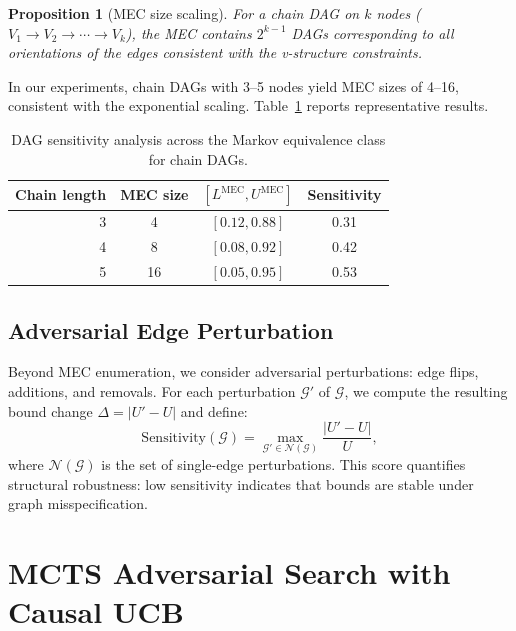 \documentclass[11pt,a4paper]{article}
\newtheorem{proposition}[theorem]{Proposition}
\newcommand{\calG}{\mathcal{G}}
\begin{document}
\begin{proposition}[MEC size scaling]
\label{prop:mec-size}
For a chain DAG on $k$ nodes ($V_1 \to V_2 \to \cdots \to V_k$), the MEC contains $2^{k-1}$ DAGs corresponding to all orientations of the edges consistent with the v-structure constraints.
\end{proposition}

In our experiments, chain DAGs with 3--5 nodes yield MEC sizes of 4--16, consistent with the exponential scaling. Table~\ref{tab:mec-results} reports representative results.

\begin{table}[t]
\centering
\caption{DAG sensitivity analysis across the Markov equivalence class for chain DAGs.}
\label{tab:mec-results}
\begin{tabular}{@{}rccc@{}}
\toprule
\textbf{Chain length} & \textbf{MEC size} & $[L^{\mathrm{MEC}}, U^{\mathrm{MEC}}]$ & \textbf{Sensitivity} \\
\midrule
3 & 4  & $[0.12, 0.88]$ & 0.31 \\
4 & 8  & $[0.08, 0.92]$ & 0.42 \\
5 & 16 & $[0.05, 0.95]$ & 0.53 \\
\bottomrule
\end{tabular}
\end{table}

\subsection{Adversarial Edge Perturbation}
\label{sec:edge-perturb}

Beyond MEC enumeration, we consider adversarial perturbations: edge flips, additions, and removals. For each perturbation $\calG'$ of $\calG$, we compute the resulting bound change $\Delta = |U' - U|$ and define:
\begin{equation}
\text{Sensitivity}(\calG) = \max_{\calG' \in \mathcal{N}(\calG)} \frac{|U' - U|}{U},
\end{equation}
where $\mathcal{N}(\calG)$ is the set of single-edge perturbations. This score quantifies structural robustness: low sensitivity indicates that bounds are stable under graph misspecification.

\section{MCTS Adversarial Search with Causal UCB}
\label{sec:mcts}
\end{document}
